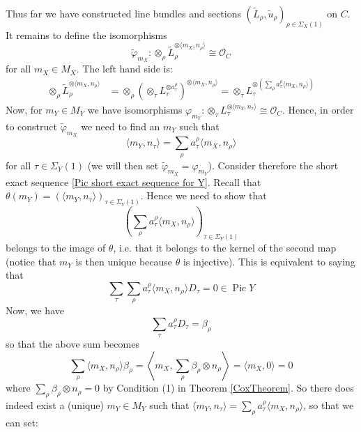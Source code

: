 \documentclass[11pt]{amsart}
\newcommand{\OO}{\mathcal{O}}
\newcommand{\Pic}{\operatorname{Pic}}
\theoremstyle{plain}
\theoremstyle{definition}
\begin{document}
Thus far we have constructed line bundles and sections $(\tilde{L}_\rho, \tilde{u}_\rho)_{\rho \in \Sigma_X(1)}$ on $C$. It remains to define the isomorphisms
\begin{equation*} \tilde{\varphi}_{m_X} : \otimes_\rho \tilde{L}_\rho^{\otimes \langle m_X, n_\rho \rangle} \cong \OO_C \end{equation*}
for all $m_X \in M_X$. The left hand side is:
\begin{align*} \otimes_\rho \tilde{L}_\rho^{\otimes \langle m_X, n_\rho \rangle} & = \otimes_\rho \left( \otimes_\tau L_\tau^{\otimes a_\tau^\rho} \right)^{\otimes \langle m_X, n_\rho \rangle} = \otimes_\tau L_\tau^{\otimes \left( \sum_{\rho} a_\tau^\rho  \langle m_X, n_\rho \rangle \right)} \end{align*}
Now, for $m_Y \in M_Y$ we have isomorphisms $\varphi_{m_Y} : \otimes_\tau L_\tau^{\otimes \langle m_Y, n_\tau \rangle} \cong \OO_C$. Hence, in order to construct $\tilde{\varphi}_{m_X}$ we need to find an $m_Y$ such that
\begin{equation*} \langle m_Y, n_\tau \rangle = \sum_\rho a_\tau^\rho \langle m_X, n_\rho \rangle \end{equation*}
for all $\tau \in \Sigma_Y(1)$ (we will then set $\tilde{\varphi}_{m_X} = \varphi_{m_Y}$). Consider therefore the short exact sequence \eqref{Pic short exact sequence for Y}. Recall that $\theta(m_Y) = (\langle m_Y, n_\tau \rangle)_{\tau \in \Sigma_Y(1)}$. Hence we need to show that
\begin{equation*} \left( \sum_\rho a_\tau^\rho \langle m_X, n_\rho \rangle \right)_{\tau \in \Sigma_Y(1)} \end{equation*}
belongs to the image of $\theta$, i.e. that it belongs to the kernel of the second map (notice that $m_Y$ is then unique because $\theta$ is injective). This is equivalent to saying that
\begin{equation*} \sum_\tau \sum_\rho a_\tau^\rho \langle m_X, n_\rho \rangle D_\tau = 0 \in \Pic Y \end{equation*}
Now, we have
\begin{equation*} \sum_\tau a_\tau^\rho D_\tau = \beta_\rho \end{equation*}
so that the above sum becomes
\begin{equation*} \sum_\rho \langle m_X, n_\rho \rangle \beta_\rho = \left\langle m_X, \sum_\rho \beta_\rho \otimes n_\rho \right \rangle = \langle m_X, 0 \rangle = 0 \end{equation*}
where $\sum_\rho \beta_\rho \otimes n_\rho = 0$ by Condition (1) in Theorem \ref{CoxTheorem}. So there does indeed exist a (unique) $m_Y \in M_Y$ such that $\langle m_Y, n_\tau \rangle = \sum_\rho a_\tau^\rho \langle m_X, n_\rho \rangle$, so that we can set:
\end{document}
